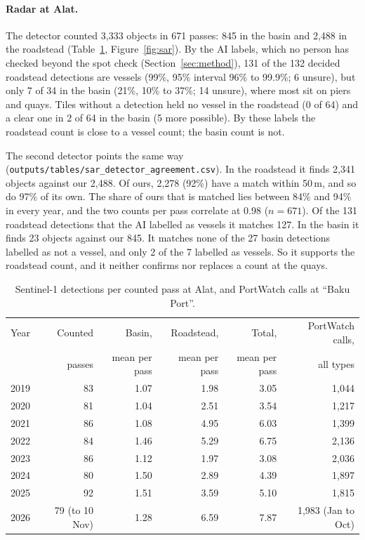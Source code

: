 \documentclass[11pt,a4paper]{article}
\begin{document}
\paragraph{Radar at Alat.} The detector counted 3,333 objects in 671 passes: 845 in the basin and 2,488 in the roadstead (Table~\ref{tab:sar}, Figure~\ref{fig:sar}). By the AI labels, which no person has checked beyond the spot check (Section~\ref{sec:method}), 131 of the 132 decided roadstead detections are vessels (99\%, 95\% interval 96\% to 99.9\%; 6 unsure), but only 7 of 34 in the basin (21\%, 10\% to 37\%; 14 unsure), where most sit on piers and quays. Tiles without a detection held no vessel in the roadstead (0 of 64) and a clear one in 2 of 64 in the basin (5 more possible). By these labels the roadstead count is close to a vessel count; the basin count is not.

The second detector points the same way (\texttt{outputs/tables/sar\_detector\_agreement.csv}). In the roadstead it finds 2,341 objects against our 2,488. Of ours, 2,278 (92\%) have a match within 50\,m, and so do 97\% of its own. The share of ours that is matched lies between 84\% and 94\% in every year, and the two counts per pass correlate at 0.98 ($n = 671$). Of the 131 roadstead detections that the AI labelled as vessels it matches 127. In the basin it finds 23 objects against our 845. It matches none of the 27 basin detections labelled as not a vessel, and only 2 of the 7 labelled as vessels. So it supports the roadstead count, and it neither confirms nor replaces a count at the quays.

\begin{table}[tbp]
\centering\small
\caption{Sentinel-1 detections per counted pass at Alat, and PortWatch calls at ``Baku Port''.}
\label{tab:sar}
\begin{tabular}{lrrrrr}
\toprule
Year & Counted & Basin, & Roadstead, & Total, & PortWatch calls, \\
 & passes & mean per pass & mean per pass & mean per pass & all types \\
\midrule
2019 & 83 & 1.07 & 1.98 & 3.05 & 1,044 \\
2020 & 81 & 1.04 & 2.51 & 3.54 & 1,217 \\
2021 & 86 & 1.08 & 4.95 & 6.03 & 1,399 \\
2022 & 84 & 1.46 & 5.29 & 6.75 & 2,136 \\
2023 & 86 & 1.12 & 1.97 & 3.08 & 2,036 \\
2024 & 80 & 1.50 & 2.89 & 4.39 & 1,897 \\
2025 & 92 & 1.51 & 3.59 & 5.10 & 1,815 \\
2026 & 79 (to 10 Nov) & 1.28 & 6.59 & 7.87 & 1,983 (Jan to Oct) \\
\bottomrule
\end{tabular}
\end{table}
\end{document}
